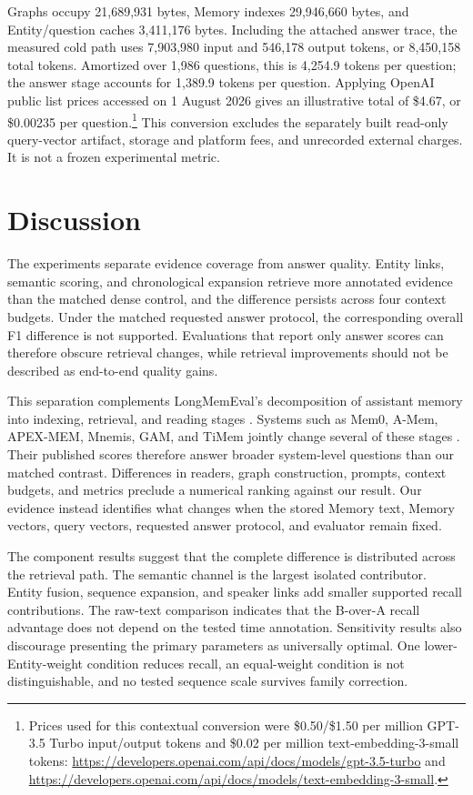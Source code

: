 \documentclass[10pt,twocolumn]{article}
\begin{document}
Graphs occupy 21,689,931 bytes, Memory indexes 29,946,660 bytes, and
Entity/question caches 3,411,176 bytes. Including the attached answer trace,
the measured cold path uses 7,903,980 input and 546,178 output tokens, or
8,450,158 total tokens. Amortized over 1,986 questions, this is 4,254.9 tokens
per question; the answer stage accounts for 1,389.9 tokens per question.
Applying OpenAI public list prices accessed on 1 August 2026 gives an
illustrative total of \$4.67, or \$0.00235 per question.\footnote{Prices used
for this contextual conversion were \$0.50/\$1.50 per million GPT-3.5 Turbo
input/output tokens and \$0.02 per million text-embedding-3-small tokens:
\url{https://developers.openai.com/api/docs/models/gpt-3.5-turbo} and
\url{https://developers.openai.com/api/docs/models/text-embedding-3-small}.}
This conversion excludes the separately built read-only query-vector artifact,
storage and platform fees, and unrecorded external charges. It is not a frozen
experimental metric.

\section{Discussion}

The experiments separate evidence coverage from answer quality. Entity links,
semantic scoring, and chronological expansion retrieve more annotated
evidence than the matched dense control, and the difference persists across
four context budgets. Under the matched requested answer protocol, the
corresponding overall F1 difference is not supported. Evaluations that report
only answer scores can therefore obscure retrieval changes, while retrieval
improvements should not be described as end-to-end quality gains.

This separation complements LongMemEval's decomposition of assistant memory
into indexing, retrieval, and reading stages \citep{wu2025longmemeval}.
Systems such as Mem0, A-Mem, APEX-MEM, Mnemis, GAM, and TiMem jointly change
several of these stages
\citep{chhikara2025mem0,xu2025amem,banerjee2026apexmem,tang2026mnemis,wu2026gam,li2026timem}.
Their published scores therefore answer broader system-level questions than
our matched contrast. Differences in readers, graph construction, prompts,
context budgets, and metrics preclude a numerical ranking against our result.
Our evidence instead identifies what changes when the stored Memory text,
Memory vectors, query vectors, requested answer protocol, and evaluator remain
fixed.

The component results suggest that the complete difference is distributed
across the retrieval path. The semantic channel is the largest isolated
contributor. Entity fusion, sequence expansion, and speaker links add smaller
supported recall contributions. The raw-text comparison indicates that the
B-over-A recall advantage does not depend on the tested time annotation.
Sensitivity results also discourage presenting the primary parameters as
universally optimal. One lower-Entity-weight condition reduces recall, an
equal-weight condition is not distinguishable, and no tested sequence scale
survives family correction.
\end{document}
